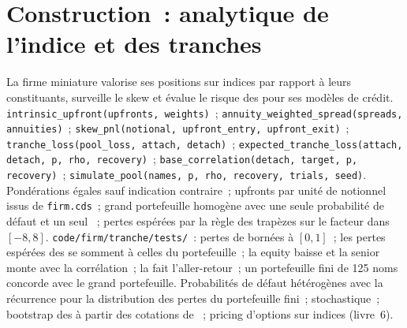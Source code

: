 \section{Construction~: analytique de l'indice et des tranches}\label{bld:m2:credit-indices-and-tranches:tranche}

\begin{build}
 La firme miniature valorise ses positions sur indices par rapport à leurs
constituants, surveille le skew et évalue le risque des  pour ses modèles de crédit.
 \texttt{intrinsic\_upfront(upfronts, weights)}~;
\texttt{annuity\_weighted\_spread(spreads, annuities)}~; \texttt{skew\_pnl(notional,
upfront\_entry, upfront\_exit)}~; \texttt{tranche\_loss(pool\_loss, attach, detach)}~;
\texttt{expected\_tranche\_loss(attach, detach, p, rho, recovery)}~;
\texttt{base\_correlation(detach, target, p, recovery)}~; \texttt{simulate\_pool(names, p,
rho, recovery, trials, seed)}.  Pondérations égales sauf indication contraire~; upfronts par unité de notionnel issus de
\texttt{firm.cds}~; grand portefeuille homogène avec une seule probabilité de défaut et un seul
~; pertes espérées par la règle des trapèzes sur le facteur dans $[-8, 8]$.
 \texttt{code/firm/tranche/tests/}~: pertes de  bornées à
$[0, 1]$~; les pertes espérées des  se somment à celles du portefeuille~; la  equity baisse et la  senior monte
avec la corrélation~; la  fait l'aller-retour~; un portefeuille fini de 125 noms concorde avec le
grand portefeuille.
 Probabilités de défaut hétérogènes avec la récurrence pour la
distribution des pertes du portefeuille fini~;  stochastique~; bootstrap des 
à partir des cotations de ~; pricing d'options sur indices (livre~6).
\end{build}

